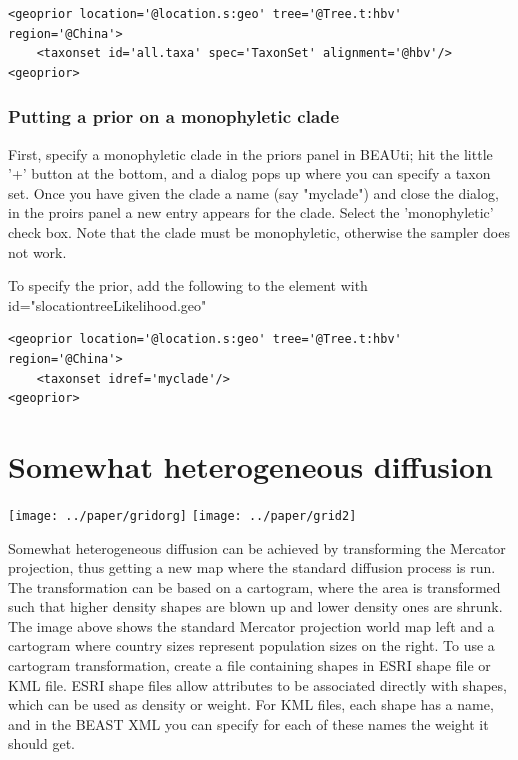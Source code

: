 \documentclass{article}
\begin{document}
\begin{verbatim}
<geoprior location='@location.s:geo' tree='@Tree.t:hbv' region='@China'>
	<taxonset id='all.taxa' spec='TaxonSet' alignment='@hbv'/>
<geoprior>
\end{verbatim}


\subsubsection*{Putting a prior on a monophyletic clade}

First, specify a monophyletic clade in the priors panel in BEAUti; hit the little '+' button at the bottom, and a dialog pops up where you can specify a taxon set. Once you have given the clade a name (say "myclade") and close the dialog, in the proirs panel a new entry appears for the clade. Select the 'monophyletic' check box. Note that the clade must be monophyletic, otherwise the sampler does not work.

To specify the prior, add the following to the element with id="slocationtreeLikelihood.geo"

\begin{verbatim}
<geoprior location='@location.s:geo' tree='@Tree.t:hbv' region='@China'>
	<taxonset idref='myclade'/>
<geoprior>
\end{verbatim}


\section*{Somewhat heterogeneous diffusion}

\texttt{[image: ../paper/gridorg]}
\texttt{[image: ../paper/grid2]}

Somewhat heterogeneous diffusion can be achieved by transforming the Mercator projection, thus getting a new map where the standard diffusion process is run. The transformation can be based on a cartogram, where the area is transformed such that higher density shapes are blown up and lower density ones are shrunk. The image above shows the standard Mercator projection world map left and a cartogram where country sizes represent population sizes on the right. To use a cartogram transformation, create a file containing shapes in ESRI shape file or KML file. ESRI shape files allow attributes to be associated directly with shapes, which can be used as density or weight. For KML files, each shape has a name, and in the BEAST XML you can specify for each of these names the weight it should get.
\end{document}
